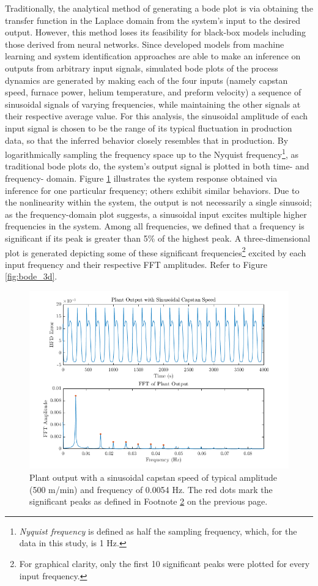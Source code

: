 Traditionally, the analytical method of generating a bode plot is via obtaining the transfer function in the Laplace domain from the system's input to the desired output. However, this method loses its feasibility for black-box models including those derived from neural networks. Since developed models from machine learning and system identification approaches are able to make an inference on outputs from arbitrary input signals, simulated bode plots of the process dynamics are generated by making each of the four inputs (namely capstan speed, furnace power, helium temperature, and preform velocity) a sequence of sinusoidal signals of varying frequencies, while maintaining the other signals at their respective average value. For this analysis, the sinusoidal amplitude of each input signal is chosen to be the range of its typical fluctuation in production data, so that the inferred behavior closely resembles that in production. By logarithmically sampling the frequency space up to the Nyquist frequency\footnote{\emph{Nyquist frequency} is defined as half the sampling frequency, which, for the data in this study, is 1 Hz.}, as traditional bode plots do, the system's output signal is plotted in both time- and frequency- domain. Figure \ref{fig:bode_peak} illustrates the system response obtained via inference for one particular frequency; others exhibit similar behaviors. Due to the nonlinearity within the system, the output is not necessarily a single sinusoid; as the frequency-domain plot suggests, a sinusoidal input excites multiple higher frequencies in the system. Among all frequencies, we defined that a frequency is significant if its peak is greater than 5\% of the highest peak. A three-dimensional plot is generated depicting some of these significant frequencies\footnote{\label{ftn:sig}For graphical clarity, only the first 10 significant peaks were plotted for every input frequency.} excited by each input frequency and their respective FFT amplitudes. Refer to Figure \ref{fig:bode_3d}.

\begin{figure}[ht]
    \centering
    \includegraphics[width=\textwidth]{figures/bode_peak.png}
    \caption{Plant output with a sinusoidal capstan speed of typical amplitude (500 m/min) and frequency of 0.0054 Hz. The red dots mark the significant peaks as defined in Footnote \ref{ftn:sig} on the previous page.}
    \label{fig:bode_peak}
\end{figure}

